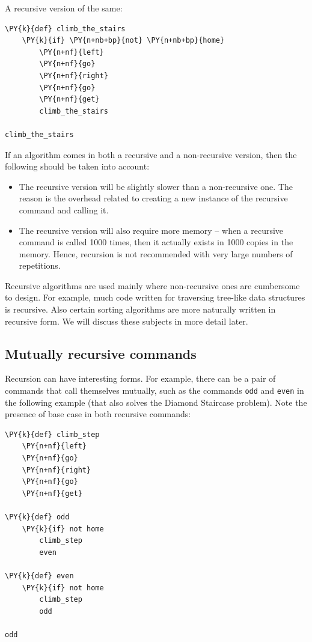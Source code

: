 \noindent
A recursive version of the same:\\

\begin{bbox}
\begin{Verbatim}[commandchars=\\\{\}]
\PY{k}{def} climb_the_stairs
    \PY{k}{if} \PY{n+nb+bp}{not} \PY{n+nb+bp}{home}
        \PY{n+nf}{left}
        \PY{n+nf}{go}
        \PY{n+nf}{right}
        \PY{n+nf}{go}
        \PY{n+nf}{get}
        climb_the_stairs

climb_the_stairs
\end{Verbatim}
\end{bbox}
\vspace{6mm}

\noindent
If an algorithm comes in both a recursive and a non-recursive version, then the following 
should be taken into account:
\begin{itemize}
\item The recursive version will be slightly slower than a non-recursive one. The reason is 
      the overhead related to creating a new instance of the recursive command and calling it. 
\item The recursive version will also require more memory -- when a recursive command is called 
      1000 times, then it actually exists in 1000 copies in the memory. Hence, recursion is 
      not recommended with very large numbers of repetitions.
\end{itemize}
Recursive algorithms are used mainly where non-recursive ones are cumbersome to design. 
For example, much code written for traversing tree-like data structures is recursive. Also certain 
sorting algorithms are more naturally written in recursive form. We will discuss these subjects 
in more detail later.

\subsection[\ \ Mutually recursive commands]{Mutually recursive commands}

Recursion can have interesting forms. For example, there can be a pair of commands
that call themselves mutually, such as the commands {\tt odd} and 
{\tt even} in the following example (that also solves the Diamond Staircase
problem). Note the presence of base case in both recursive commands:\\
 
\begin{bbox}
\begin{Verbatim}[commandchars=\\\{\}]
\PY{k}{def} climb_step
    \PY{n+nf}{left}
    \PY{n+nf}{go}
    \PY{n+nf}{right}
    \PY{n+nf}{go}
    \PY{n+nf}{get} 

\PY{k}{def} odd
    \PY{k}{if} not home
        climb_step
        even

\PY{k}{def} even
    \PY{k}{if} not home
        climb_step
        odd
    
odd
\end{Verbatim}
\end{bbox}

